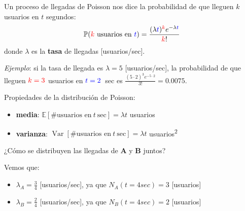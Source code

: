 \documentclass[xcolor={x11names}]{beamer}
\DeclareMathOperator{\Var}{Var}
\newcommand{\red}[1]{{\color{red}#1}}
\newcommand{\blue}[1]{{\color{blue}#1}}
\begin{document}
\begin{frame}{\secname}
    Un proceso de llegadas de Poisson nos
    dice la probabilidad de que lleguen
    $k$ usuarios en $t$ segundos:
    \begin{equation}
        \mathbb{P}(\red{k}\ \text{usuarios en}\ \blue{t})=\frac{(\lambda \blue{t})^\red{k} e^{-\lambda \blue{t} }}{\red{k}!}
        \label{eq:poisson}
    \end{equation}
    donde $\lambda$ es la \textbf{tasa}
    de llegadas [usuarios/sec].

    \vfill

    \textit{Ejemplo}: si la tasa
    de llegada es $\lambda=5$ [usuarios/sec],
    la probabilidad de
    que lleguen $\red{k=3}$ usuarios en $\blue{t=2}$~sec es
    $\tfrac{(5\cdot2)^3 e^{-5\cdot2}}{3!}=0.0075$.
\end{frame}




\begin{frame}{\secname}
    Propiedades de la distribución de Poisson:
    \begin{itemize}
        \item \textbf{media}: $\mathbb{E}[\text{\#usuarios en}\ t\ \text{sec}]=\lambda t$ usuarios
        \item \textbf{varianza}: $\Var[\text{\#usuarios en}\ t\ \text{sec}]=\lambda t$ usuarios\textsuperscript{2}
    \end{itemize}

    \begin{figure}
        
    \end{figure}
\end{frame}


\begin{frame}{\secname}
    ¿Cómo se distribuyen las llegadas
    de \textbf{\color{Firebrick1}A} y
    \textbf{\color{Firebrick4}B} juntos?

    \begin{figure}
        
    \end{figure}

    Vemos que:
    \begin{itemize}
        \item {\color{Firebrick1}$\lambda_A=\tfrac{3}{4}$} [usuarios/sec], ya que {\color{Firebrick1}$N_A(t=4sec)=3$} [usuarios]
        \item {\color{Firebrick4}$\lambda_B=\tfrac{2}{4}$} [usuarios/sec], ya que {\color{Firebrick4}$N_B(t=4sec)=2$} [usuarios]
    \end{itemize}

\end{frame}
\end{document}
